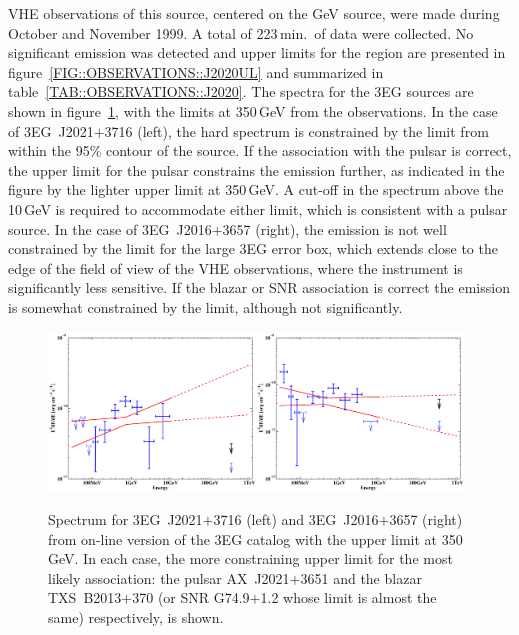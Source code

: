 VHE observations of this source, centered on the GeV source, were made
during October and November 1999. A total of 223\,min.\ of data were
collected. No significant emission was detected and upper limits for
the region are presented in figure~\ref{FIG::OBSERVATIONS::J2020UL}
and summarized in table~\ref{TAB::OBSERVATIONS::J2020}. The spectra
for the 3EG sources are shown in
figure~\ref{FIG::OBSERVATIONS::J2020SPEC}, with the limits at 350\,GeV
from the observations. In the case of 3EG~J2021$+$3716 (left), the
hard spectrum is constrained by the limit from within the 95\% contour
of the source. If the association with the pulsar is correct, the
upper limit for the pulsar constrains the emission further, as
indicated in the figure by the lighter upper limit at 350\,GeV. A
cut-off in the spectrum above the 10\,GeV is required to accommodate
either limit, which is consistent with a pulsar source. In the case of
3EG~J2016$+$3657 (right), the emission is not well constrained by the
limit for the large 3EG error box, which extends close to the edge of
the field of view of the VHE observations, where the instrument is
significantly less sensitive. If the blazar or SNR association is correct
the emission is somewhat constrained by the limit, although not 
significantly.

\begin{figure}[t]
\includegraphics[angle=270,width=0.49\textwidth]{plots/chap-observations/spectra/3EG_J2021+3716.pdf}\hspace*{\fill}\includegraphics[angle=270,width=0.49\textwidth]{plots/chap-observations/spectra/3EG_J2016+3657.pdf}
\caption{\label{FIG::OBSERVATIONS::J2020SPEC} Spectrum for 
3EG~J2021$+$3716 (left) and 3EG~J2016$+$3657 (right) from on-line
version of the 3EG catalog with the upper limit at 350\,GeV. In each
case, the more constraining upper limit for the most likely
association: the pulsar AX~J2021$+$3651 and the blazar TXS~B2013$+$370
(or SNR G74.9$+$1.2 whose limit is almost the same) respectively, is
shown.}
\end{figure}


